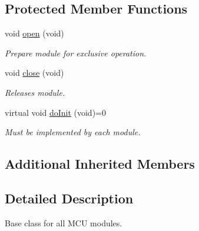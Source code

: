 \subsection*{Protected Member Functions}
\begin{DoxyCompactItemize}
\item 
\hypertarget{classyahal_1_1mcu_1_1detail_1_1_base_module_a3638ef4cd8297b77346db4a0e78034c1}{}void \hyperlink{classyahal_1_1mcu_1_1detail_1_1_base_module_a3638ef4cd8297b77346db4a0e78034c1}{open} (void)\label{classyahal_1_1mcu_1_1detail_1_1_base_module_a3638ef4cd8297b77346db4a0e78034c1}

\begin{DoxyCompactList}\small\item\em Prepare module for exclusive operation. \end{DoxyCompactList}\item 
\hypertarget{classyahal_1_1mcu_1_1detail_1_1_base_module_aa11d9d5e9a7b9cb79e265584b2d8a7d5}{}void \hyperlink{classyahal_1_1mcu_1_1detail_1_1_base_module_aa11d9d5e9a7b9cb79e265584b2d8a7d5}{close} (void)\label{classyahal_1_1mcu_1_1detail_1_1_base_module_aa11d9d5e9a7b9cb79e265584b2d8a7d5}

\begin{DoxyCompactList}\small\item\em Releases module. \end{DoxyCompactList}\item 
\hypertarget{classyahal_1_1mcu_1_1detail_1_1_base_module_a799409982a407d4894631685fb55f1a0}{}virtual void \hyperlink{classyahal_1_1mcu_1_1detail_1_1_base_module_a799409982a407d4894631685fb55f1a0}{do\+Init} (void)=0\label{classyahal_1_1mcu_1_1detail_1_1_base_module_a799409982a407d4894631685fb55f1a0}

\begin{DoxyCompactList}\small\item\em Must be implemented by each module. \end{DoxyCompactList}\end{DoxyCompactItemize}
\subsection*{Additional Inherited Members}


\subsection{Detailed Description}
Base class for all M\+C\+U modules. 


